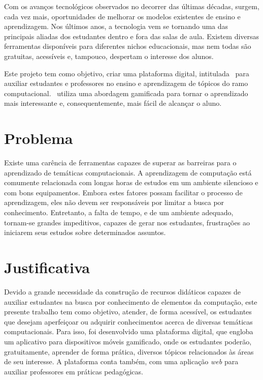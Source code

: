 Com os avanços tecnológicos observados no decorrer das últimas décadas, surgem, cada vez mais, oportunidades de melhorar os modelos existentes de ensino e aprendizagem. Nos últimos anos, a tecnologia vem se tornando uma das principais aliadas dos estudantes dentro e fora das salas de aula. Existem diversas ferramentas disponíveis para diferentes nichos educacionais, mas nem todas são gratuitas, acessíveis e, tampouco, despertam o interesse dos alunos.

Este projeto tem como objetivo, criar uma plataforma digital, intitulada \appName\, para auxiliar estudantes e professores no ensino e aprendizagem de tópicos do ramo computacional. \appName\ utiliza uma abordagem gamificada \cite{gamification_motivates} para tornar o aprendizado mais interessante e, consequentemente, mais fácil de alcançar o aluno.

\section{Problema}

Existe uma carência de ferramentas capazes de superar as barreiras para o aprendizado de temáticas computacionais. A aprendizagem de computação está comumente relacionada com longas horas de estudos em um ambiente silencioso e com bons equipamentos. Embora estes fatores possam facilitar o processo de aprendizagem, eles não devem ser responsáveis por limitar a busca por conhecimento. Entretanto, a falta de tempo, e de um ambiente adequado, tornam-se grandes impeditivos, capazes de gerar nos estudantes, frustrações ao iniciarem seus estudos sobre determinados assuntos.

\section{Justificativa}
Devido a grande necessidade da construção de recursos didáticos capazes de auxiliar estudantes na busca por conhecimento de elementos da computação, este presente trabalho tem como objetivo, atender, de forma acessível, os estudantes que desejam aperfeiçoar ou adquirir conhecimentos acerca de diversas temáticas computacionais. Para isso, foi desenvolvido uma plataforma digital, que engloba um aplicativo para dispositivos móveis gamificado, onde os estudantes poderão, gratuitamente, aprender de forma prática, diversos tópicos relacionados às áreas de seu interesse. A plataforma conta também, com uma aplicação \textit{web} para auxiliar professores em práticas pedagógicas.


